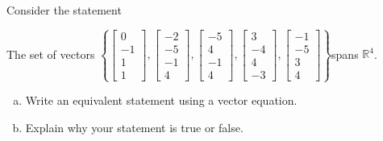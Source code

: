 
\begin{exerciseStatement}


Consider the statement 
\begin{center}\begin{minipage}{0.8\textwidth}
 The set of vectors \( \left\{ \left[\begin{array}{c}
0 \\
-1 \\
1 \\
1
\end{array}\right] , \left[\begin{array}{c}
-2 \\
-5 \\
-1 \\
4
\end{array}\right] , \left[\begin{array}{c}
-5 \\
4 \\
-1 \\
4
\end{array}\right] , \left[\begin{array}{c}
3 \\
-4 \\
4 \\
-3
\end{array}\right] , \left[\begin{array}{c}
-1 \\
-5 \\
3 \\
4
\end{array}\right] \right\} \)spans \(\mathbb{R}^4\). 
\end{minipage}\end{center}
    


\begin{enumerate}[(a)]
\item  Write an equivalent statement using a vector equation.
\item  Explain why your statement is true or false.
\end{enumerate}
    
\end{exerciseStatement}
    
